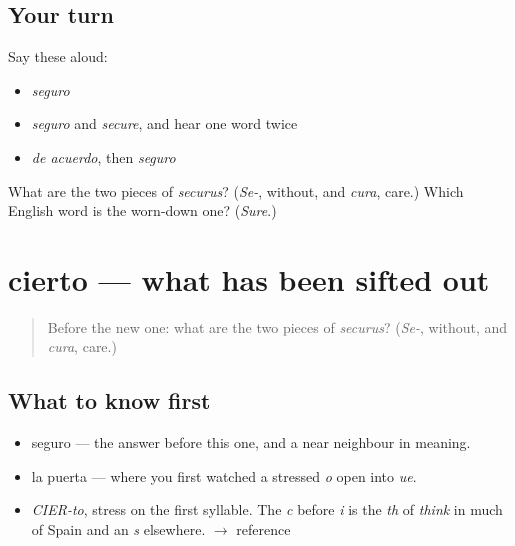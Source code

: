 \subsection*{Your turn}
Say these aloud:

\begin{itemize}
\raggedright
  \item \emph{seguro}
  \item \emph{seguro} and \emph{secure}, and hear one word twice
  \item \emph{de acuerdo}, then \emph{seguro}
\end{itemize}

\begin{tcolorbox}[breakable,colback=teal!4,colframe=teal!35!black,title={Before you move on}]
What are the two pieces of \emph{securus}? (\emph{Se-}, without, and \emph{cura}, care.) Which English word is the worn-down one? (\emph{Sure}.)
\end{tcolorbox}
\section[cierto]{cierto — what has been sifted out}

\label{lesson:ES-C284-cierto}



\begin{quote}
Before the new one: what are the two pieces of \emph{securus}? (\emph{Se-}, without, and \emph{cura}, care.)
\end{quote}

\subsection*{What to know first}
\begin{itemize}
\raggedright
  \item seguro — the answer before this one, and a near neighbour in meaning.
  \item la puerta — where you first watched a stressed \emph{o} open into \emph{ue}.
\end{itemize}

\begin{sounds}
\begin{itemize}
\raggedright
  \item \emph{CIER-to}, stress on the first syllable. The \emph{c} before \emph{i} is the \emph{th} of \emph{think} in much of Spain and an \emph{s} elsewhere. $\to$ reference
\end{itemize}
\end{sounds}

